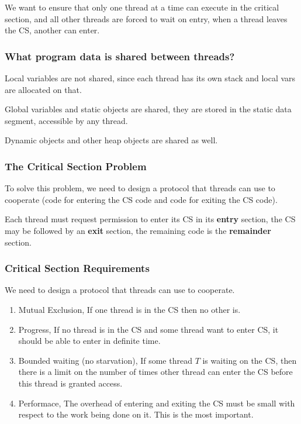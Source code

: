 \documentclass{article}
\begin{document}
We want to ensure that only one thread at a time can execute in the critical section, and all other threads are forced to wait on entry, when a thread leaves the CS, another can enter.

\subsubsection{What program data is shared between threads?}

Local variables are not shared, since each thread has its own stack and local vars are allocated on that.

Global variables and static objects are shared, they are stored in the static data segment, accessible by any thread.

Dynamic objects and other heap objects are shared as well.

\subsubsection{The Critical Section Problem}

To solve this problem, we need to design a protocol that threads can use to cooperate (code for entering the CS code and code for exiting the CS code).

Each thread must request permission to enter its CS in its \textbf{entry} section, the CS may be followed by an \textbf{exit} section, the remaining code is the \textbf{remainder} section.

\subsubsection{Critical Section Requirements}

We need to design a protocol that threads can use to cooperate.
\begin{enumerate}
  \item Mutual Exclusion, If one thread is in the CS then no other is.
  \item Progress, If no thread is in the CS and some thread want to enter CS, it should be able to enter in definite time.
  \item Bounded waiting (no starvation), If some thread $T$ is waiting on the CS, then there is a limit on the number of times other thread can enter the CS before this thread is granted access.
  \item Performace, The overhead of entering and exiting the CS must be small with respect to the work being done on it. This is the most important.
\end{enumerate}
\end{document}
